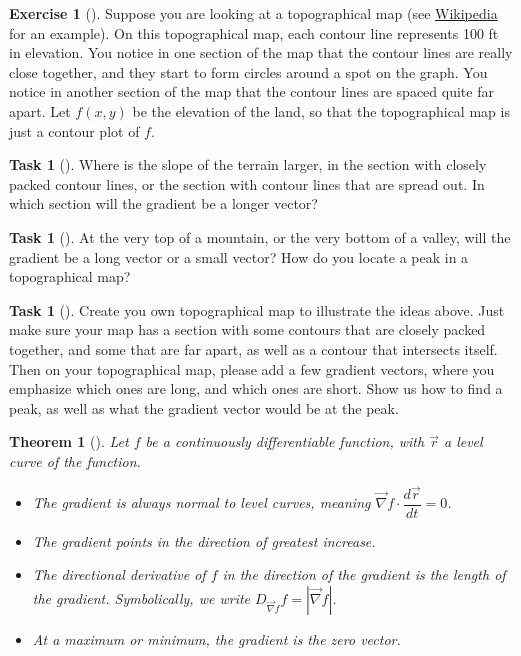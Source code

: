 \documentclass[10pt,]{book}
\theoremstyle{plain}
\newtheorem{theorem}{Theorem}[section]
\theoremstyle{definition}
\theoremstyle{definition}
\theoremstyle{definition}
\theoremstyle{definition}
\newtheorem{exploration}[project]{Exercise}
\newtheorem{task}[project]{Task}
\theoremstyle{definition}
\numberwithin{equation}{section}
\begin{document}
\begin{exploration}[]\label{exploration-230}
Suppose you are looking at a topographical map (see \href{http://en.wikipedia.org/wiki/Topographic_map}{Wikipedia} for an example). On this topographical map, each contour line represents 100 ft in elevation. You notice in one section of the map that the contour lines are really close together, and they start to form circles around a spot on the graph. You notice in another section of the map that the contour lines are spaced quite far apart. Let \(f(x,y)\) be the elevation of the land, so that the topographical map is just a contour plot of \(f\).%
\begin{task}[]\label{task-613}
Where is the slope of the terrain larger, in the section with closely packed contour lines, or the section with contour lines that are spread out. In which section will the gradient be a longer vector?%
\end{task}
\begin{task}[]\label{task-614}
At the very top of a mountain, or the very bottom of a valley, will the gradient be a long vector or a small vector? How do you locate a peak in a topographical map?%
\end{task}
\begin{task}[]\label{task-615}
Create you own topographical map to illustrate the ideas above. Just make sure your map has a section with some contours that are closely packed together, and some that are far apart, as well as a contour that intersects itself. Then on your topographical map, please add a few gradient vectors, where you emphasize which ones are long, and which ones are short. Show us how to find a peak, as well as what the gradient vector would be at the peak.%
\end{task}
\end{exploration}
\begin{theorem}[{}]\label{theorem-7}
Let \(f\) be a continuously differentiable function, with \(\vec r\) a level curve of the function. \leavevmode%
\begin{itemize}[label=\textbullet]
\item{}The gradient is always normal to level curves, meaning \(\vec \nabla f\cdot \dfrac{d\vec r}{dt}=0\).%
\item{}The gradient points in the direction of greatest increase.%
\item{}The directional derivative of \(f\) in the direction of the gradient is the length of the gradient. Symbolically, we write \(D_{\vec \nabla f}f = |\vec \nabla f|\).%
\item{}At a maximum or minimum, the gradient is the zero vector.%
\end{itemize}
%
\end{theorem}
\end{document}
